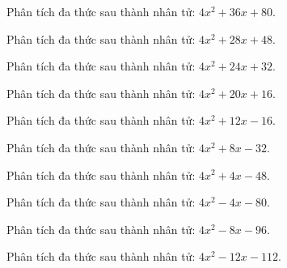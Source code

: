 \begin{bt}
	Phân tích đa thức sau thành nhân tử: $4 x^2 + 36 x + 80$.
\end{bt}
\begin{bt}
	Phân tích đa thức sau thành nhân tử: $4 x^2 + 28 x + 48$.
\end{bt}
\begin{bt}
	Phân tích đa thức sau thành nhân tử: $4 x^2 + 24 x + 32$.
\end{bt}
\begin{bt}
	Phân tích đa thức sau thành nhân tử: $4 x^2 + 20 x + 16$.
\end{bt}
\begin{bt}
	Phân tích đa thức sau thành nhân tử: $4 x^2 + 12 x - 16$.
\end{bt}
\begin{bt}
	Phân tích đa thức sau thành nhân tử: $4 x^2 + 8 x - 32$.
\end{bt}
\begin{bt}
	Phân tích đa thức sau thành nhân tử: $4 x^2 + 4 x - 48$.
\end{bt}
\begin{bt}
	Phân tích đa thức sau thành nhân tử: $4 x^2 - 4 x - 80$.
\end{bt}
\begin{bt}
	Phân tích đa thức sau thành nhân tử: $4 x^2 - 8 x - 96$.
\end{bt}
\begin{bt}
	Phân tích đa thức sau thành nhân tử: $4 x^2 - 12 x - 112$.
\end{bt}
